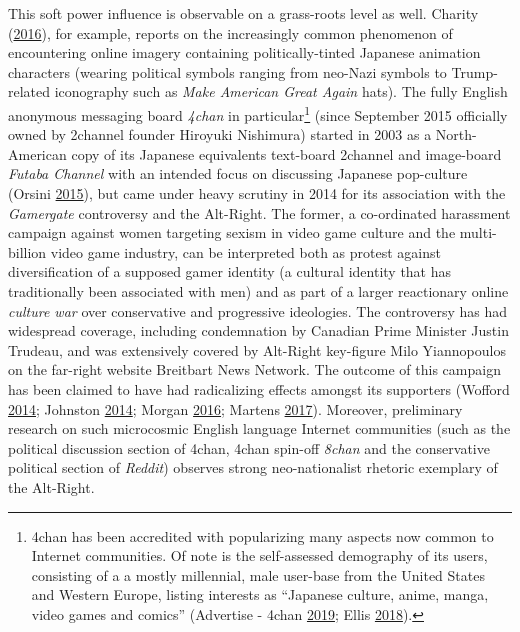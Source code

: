 \documentclass[10pt,british,A4paper,twoside]{memoir}
\begin{document}
This soft power influence is observable on a grass-roots level as well.
Charity (\protect\hyperlink{ref-charity_why_2016}{2016}), for example,
reports on the increasingly common phenomenon of encountering online
imagery containing politically-tinted Japanese animation characters
(wearing political symbols ranging from neo-Nazi symbols to
Trump-related iconography such as \emph{Make American Great Again}
hats). The fully English anonymous messaging board \emph{4chan} in
particular\footnote{4chan has been accredited with popularizing many
  aspects now common to Internet communities. Of note is the
  self-assessed demography of its users, consisting of a a mostly
  millennial, male user-base from the United States and Western Europe,
  listing interests as ``Japanese culture, anime, manga, video games and
  comics'' (Advertise - 4chan
  \protect\hyperlink{ref-noauthor_advertise_nodate}{2019}; Ellis
  \protect\hyperlink{ref-ellis_4chan_2018}{2018}).} (since September
2015 officially owned by 2channel founder Hiroyuki Nishimura) started in
2003 as a North-American copy of its Japanese equivalents text-board
2channel and image-board \emph{Futaba Channel} with an intended focus on
discussing Japanese pop-culture (Orsini
\protect\hyperlink{ref-orsini_how_2015}{2015}), but came under heavy
scrutiny in 2014 for its association with the \emph{Gamergate}
controversy and the Alt-Right. The former, a co-ordinated harassment
campaign against women targeting sexism in video game culture and the
multi-billion video game industry, can be interpreted both as protest
against diversification of a supposed gamer identity (a cultural
identity that has traditionally been associated with men) and as part of
a larger reactionary online \emph{culture war} over conservative and
progressive ideologies. The controversy has had widespread coverage,
including condemnation by Canadian Prime Minister Justin Trudeau, and
was extensively covered by Alt-Right key-figure Milo Yiannopoulos on the
far-right website Breitbart News Network. The outcome of this campaign
has been claimed to have had radicalizing effects amongst its supporters
(Wofford \protect\hyperlink{ref-wofford_is_2014}{2014}; Johnston
\protect\hyperlink{ref-johnston_chat_2014}{2014}; Morgan
\protect\hyperlink{ref-morgan_analysis_2016}{2016}; Martens
\protect\hyperlink{ref-martens_rally_2017}{2017}). Moreover, preliminary
research on such microcosmic English language Internet communities (such
as the political discussion section of 4chan, 4chan spin-off
\emph{8chan} and the conservative political section of \emph{Reddit})
observes strong neo-nationalist rhetoric exemplary of the Alt-Right.
\end{document}
